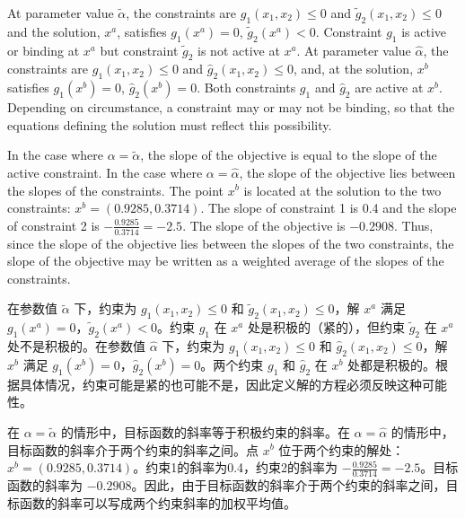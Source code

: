 \begin{original}
At parameter value $\tilde{\alpha}$, the constraints are $g_1(x_1, x_2) \le 0$ and $\tilde{g}_2(x_1, x_2) \le 0$ and the solution, $x^a$, satisfies $g_1(x^a) = 0$, $\tilde{g}_2(x^a) < 0$. Constraint $g_1$ is active or binding at $x^a$ but constraint $\tilde{g}_2$ is not active at $x^a$. At parameter value $\hat{\alpha}$, the constraints are $g_1(x_1, x_2) \le 0$ and $\hat{g}_2(x_1, x_2) \le 0$, and, at the solution, $x^b$ satisfies $g_1(x^b) = 0$, $\hat{g}_2(x^b) = 0$. Both constraints $g_1$ and $\hat{g}_2$ are active at $x^b$. Depending on circumstance, a constraint may or may not be binding, so that the equations defining the solution must reflect this possibility.

In the case where $\alpha = \tilde{\alpha}$, the slope of the objective is equal to the slope of the active constraint. In the case where $\alpha = \hat{\alpha}$, the slope of the objective lies between the slopes of the constraints. The point $x^b$ is located at the solution to the two constraints: $x^b = (0.9285,0.3714)$. The slope of constraint 1 is 0.4 and the slope of constraint 2 is $-\frac{0.9285}{0.3714} = -2.5$. The slope of the objective is $-0.2908$. Thus, since the slope of the objective lies between the slopes of the two constraints, the slope of the objective may be written as a weighted average of the slopes of the constraints.
\end{original}
\begin{translation}
在参数值 $\tilde{\alpha}$ 下，约束为 $g_1(x_1, x_2) \le 0$ 和 $\tilde{g}_2(x_1, x_2) \le 0$，解 $x^a$ 满足 $g_1(x^a) = 0$，$\tilde{g}_2(x^a) < 0$。约束 $g_1$ 在 $x^a$ 处是积极的（紧的），但约束 $\tilde{g}_2$ 在 $x^a$ 处不是积极的。在参数值 $\hat{\alpha}$ 下，约束为 $g_1(x_1, x_2) \le 0$ 和 $\hat{g}_2(x_1, x_2) \le 0$，解 $x^b$ 满足 $g_1(x^b) = 0$，$\hat{g}_2(x^b) = 0$。两个约束 $g_1$ 和 $\hat{g}_2$ 在 $x^b$ 处都是积极的。根据具体情况，约束可能是紧的也可能不是，因此定义解的方程必须反映这种可能性。

在 $\alpha = \tilde{\alpha}$ 的情形中，目标函数的斜率等于积极约束的斜率。在 $\alpha = \hat{\alpha}$ 的情形中，目标函数的斜率介于两个约束的斜率之间。点 $x^b$ 位于两个约束的解处：$x^b = (0.9285,0.3714)$。约束1的斜率为0.4，约束2的斜率为 $-\frac{0.9285}{0.3714} = -2.5$。目标函数的斜率为 $-0.2908$。因此，由于目标函数的斜率介于两个约束的斜率之间，目标函数的斜率可以写成两个约束斜率的加权平均值。
\end{translation}

